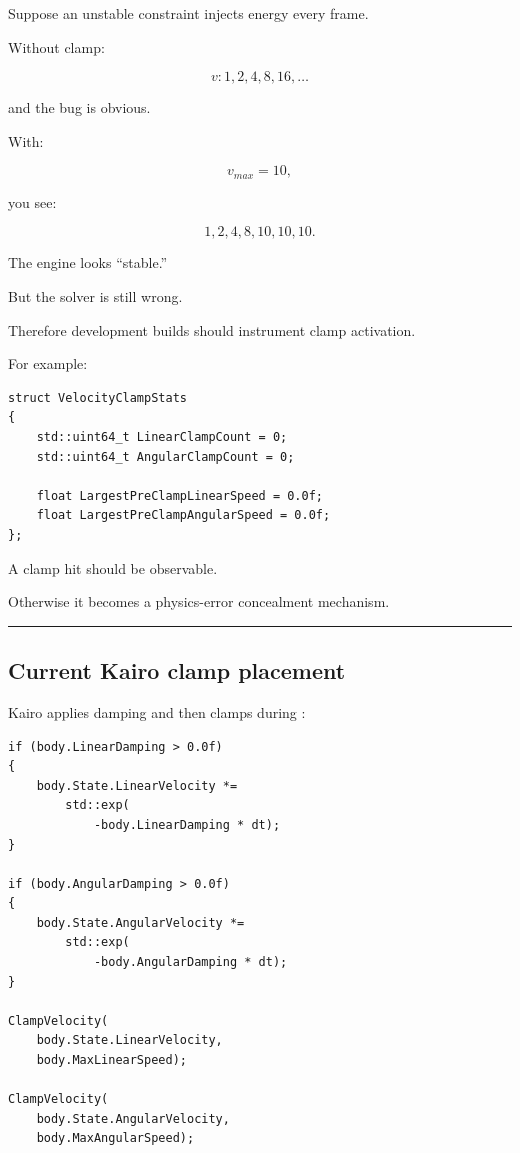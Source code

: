 \hypertarget{06-engine-ii-ch038-clamps-can-hide-bugs}{}

Suppose an unstable constraint injects energy every frame.

Without clamp:

\[
v:
1,2,4,8,16,\ldots
\]

and the bug is obvious.

With:

\[
v_{max}=10,
\]

you see:

\[
1,2,4,8,10,10,10.
\]

The engine looks ``stable.''

But the solver is still wrong.

Therefore development builds should instrument clamp activation.

For example:

\begin{verbatim}
struct VelocityClampStats
{
    std::uint64_t LinearClampCount = 0;
    std::uint64_t AngularClampCount = 0;

    float LargestPreClampLinearSpeed = 0.0f;
    float LargestPreClampAngularSpeed = 0.0f;
};
\end{verbatim}

A clamp hit should be observable.

Otherwise it becomes a physics-error concealment mechanism.

\begin{center}\rule{0.5\linewidth}{0.5pt}\end{center}

\subsection{Current Kairo clamp placement}\label{06-engine-ii-ch038-current-kairo-clamp-placement}

\hypertarget{06-engine-ii-ch038-current-kairo-clamp-placement}{}

Kairo applies damping and then clamps during :

\begin{verbatim}
if (body.LinearDamping > 0.0f)
{
    body.State.LinearVelocity *=
        std::exp(
            -body.LinearDamping * dt);
}

if (body.AngularDamping > 0.0f)
{
    body.State.AngularVelocity *=
        std::exp(
            -body.AngularDamping * dt);
}

ClampVelocity(
    body.State.LinearVelocity,
    body.MaxLinearSpeed);

ClampVelocity(
    body.State.AngularVelocity,
    body.MaxAngularSpeed);
\end{verbatim}

